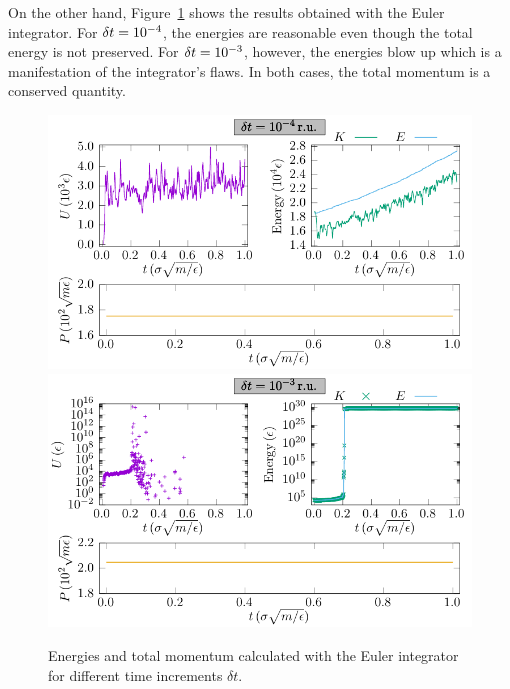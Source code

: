 \documentclass{article}
\begin{document}
  On the other hand, Figure~\ref{fig:euler} shows the results obtained with the Euler integrator. For \(\delta t=10^{-4}\), the energies are reasonable even though the total energy is not preserved. For \(\delta t=10^{-3}\), however, the energies blow up which is a manifestation of the integrator's flaws. In both cases, the total momentum is a conserved quantity.
  \begin{figure}[htb]
    \centering
        \includegraphics[width=\linewidth]{../figures/euler_energies_01.pdf}
    \endminipage%
        \includegraphics[width=\linewidth]{../figures/euler_energies_02.pdf}
    \endminipage
    \caption{Energies and total momentum calculated with the Euler integrator for different time increments \(\delta t\).}\label{fig:euler}
  \end{figure}
\end{document}
